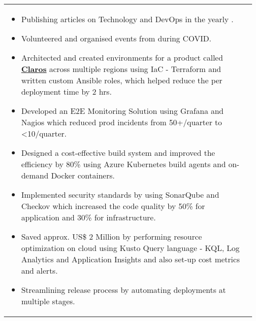 \documentclass[11pt, a4paper]{article}
\begin{document}
\begin{tabular}{L{1.7cm}!{\color{gray}\vrule}l}
\begin{minipage}[t]{0.86\textwidth}
\begin{itemize}[leftmargin=*]
    \item Publishing articles on Technology and DevOps in the yearly .
    \item Volunteered and organised  events from  during COVID.
    \item Architected and created environments for a product called \href{https://www.hach.com/claros/overview#claros-video}{\bf Claros} across multiple regions using IaC - Terraform and written custom Ansible roles, which helped reduce the per deployment time by 2 hrs.
	\item Developed an E2E Monitoring Solution using Grafana and Nagios which reduced prod incidents from 50+/quarter to <10/quarter.
	\item Designed a cost-effective build system and improved the efficiency by 80\% using Azure Kubernetes build agents and on-demand Docker containers.
	\item Implemented security standards by using SonarQube and Checkov which increased the code quality by 50\% for application and 30\% for infrastructure.
	\item Saved approx. US\$ 2 Million by performing resource optimization on cloud using Kusto Query language - KQL, Log Analytics and Application Insights and also set-up cost metrics and alerts.
	\item Streamlining release process by automating deployments at multiple stages.
    \end{itemize}
  \end{minipage}
\end{tabular} 

\vspace{4mm}
\end{document}
